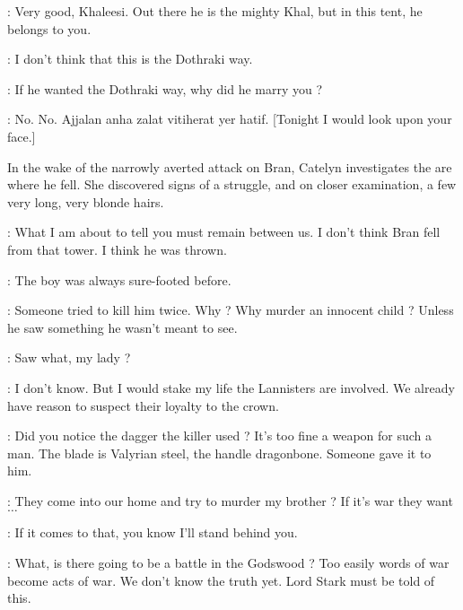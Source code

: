 
\DOREAH:  Very good, Khaleesi. Out there he is the mighty Khal, but in this tent, he belongs to you. 

\DAENERYS: I don't think that this is the Dothraki way. 

\DOREAH: If he wanted the Dothraki way, why did he marry you ? 


\DAENERYS: No. No. Ajjalan anha zalat vitiherat yer hatif. [Tonight I would look upon your face.] 


\scene

\n In the wake of the narrowly averted attack on Bran, Catelyn investigates the are where he fell.  She discovered signs of a struggle, and on closer examination, a few very long, very blonde hairs.



\CATELYN: What I am about to tell you must remain between us. I don't think Bran fell from that tower. I think he was thrown. 

\LUWIN: The boy was always sure-footed before. 

\CATELYN: Someone tried to kill him twice. Why ? Why murder an innocent child ? Unless he saw something he wasn't meant to see. 

\THEON: Saw what, my lady ? 

\CATELYN: I don't know. But I would stake my life the Lannisters are involved. We already have reason to suspect their loyalty to the crown. 

\RODRIK: Did you notice the dagger the killer used ? It's too fine a weapon for such a man. The blade is Valyrian steel, the handle dragonbone. Someone gave it to him. 

\ROBB: They come into our home and try to murder my brother ? If it's war they want$\ldots$ 

\THEON: If it comes to that, you know I'll stand behind you. 

\LUWIN: What, is there going to be a battle in the Godswood ? Too easily words of war become acts of war. We don't know the truth yet. Lord Stark must be told of this. 

